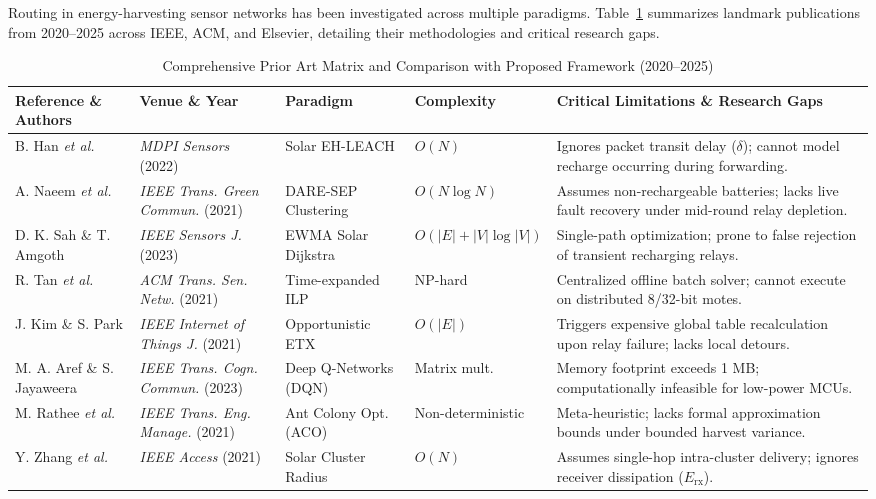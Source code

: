 \documentclass[journal]{IEEEtran}
\begin{document}
Routing in energy-harvesting sensor networks has been investigated across multiple paradigms. Table~\ref{tab:literature} summarizes landmark publications from 2020--2025 across IEEE, ACM, and Elsevier, detailing their methodologies and critical research gaps.

\begin{table}[!t]
\caption{Comprehensive Prior Art Matrix and Comparison with Proposed Framework (2020--2025)}
\label{tab:literature}
\centering
\begin{tabular}{@{}llllp{5.8cm}@{}}
\toprule
\textbf{Reference \& Authors} & \textbf{Venue \& Year} & \textbf{Paradigm} & \textbf{Complexity} & \textbf{Critical Limitations \& Research Gaps} \\
\midrule
B. Han \textit{et al.} \cite{han2022novel} & \textit{MDPI Sensors} (2022) & Solar EH-LEACH & $O(N)$ & Ignores packet transit delay ($\delta$); cannot model recharge occurring during forwarding. \\
A. Naeem \textit{et al.} \cite{naeem2021dare} & \textit{IEEE Trans. Green Commun.} (2021) & DARE-SEP Clustering & $O(N \log N)$ & Assumes non-rechargeable batteries; lacks live fault recovery under mid-round relay depletion. \\
D. K. Sah \& T. Amgoth \cite{sah2023harvested} & \textit{IEEE Sensors J.} (2023) & EWMA Solar Dijkstra & $O(|E| + |V|\log |V|)$ & Single-path optimization; prone to false rejection of transient recharging relays. \\
R. Tan \textit{et al.} \cite{tan2021throughput} & \textit{ACM Trans. Sen. Netw.} (2021) & Time-expanded ILP & NP-hard & Centralized offline batch solver; cannot execute on distributed 8/32-bit motes. \\
J. Kim \& S. Park \cite{kim2021energy} & \textit{IEEE Internet of Things J.} (2021) & Opportunistic ETX & $O(|E|)$ & Triggers expensive global table recalculation upon relay failure; lacks local detours. \\
M. A. Aref \& S. Jayaweera \cite{aref2023deep} & \textit{IEEE Trans. Cogn. Commun.} (2023) & Deep Q-Networks (DQN) & Matrix mult. & Memory footprint exceeds 1 MB; computationally infeasible for low-power MCUs. \\
M. Rathee \textit{et al.} \cite{rathee2021qos} & \textit{IEEE Trans. Eng. Manage.} (2021) & Ant Colony Opt. (ACO) & Non-deterministic & Meta-heuristic; lacks formal approximation bounds under bounded harvest variance. \\
Y. Zhang \textit{et al.} \cite{zhang2021energy} & \textit{IEEE Access} (2021) & Solar Cluster Radius & $O(N)$ & Assumes single-hop intra-cluster delivery; ignores receiver dissipation ($E_{\text{rx}}$). \\

\end{tabular}
\end{table}
\end{document}
